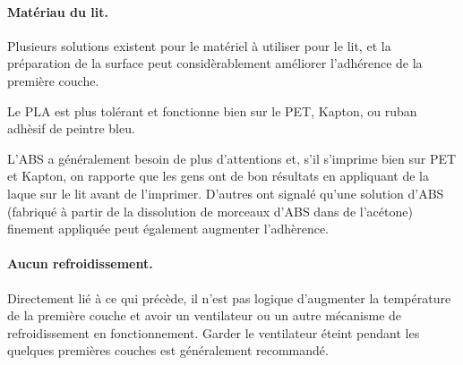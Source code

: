 \paragraph{Matériau du lit.} %
\label{par:bed_material}
Plusieurs solutions existent pour le matériel à utiliser pour le lit, et la préparation de la surface peut considèrablement améliorer l'adhérence de la première couche.

Le PLA est plus tolérant et fonctionne bien sur le PET, Kapton, ou ruban adhèsif de peintre bleu.


L'ABS a généralement besoin de plus d'attentions et, s'il s'imprime bien sur PET et Kapton, on rapporte que les gens ont de bon résultats en appliquant de la laque sur le lit avant de l'imprimer. D'autres ont signalé qu'une solution d'ABS (fabriqué à partir de la dissolution de morceaux d'ABS dans de l'acétone) finement appliquée peut également augmenter l'adhèrence.

\paragraph{Aucun refroidissement.} %
\label{par:no_cooling}
Directement lié à ce qui précède, il n'est pas logique d'augmenter la température de la première couche et avoir un ventilateur ou un autre mécanisme de refroidissement en fonctionnement. Garder le ventilateur éteint pendant les quelques premières couches est généralement recommandé.

